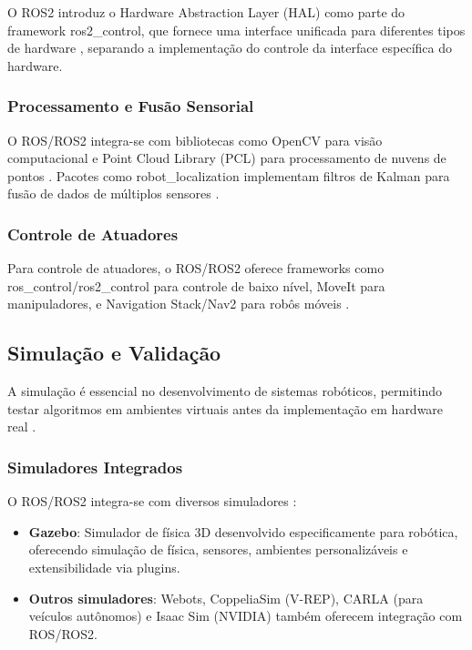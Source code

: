 O ROS2 introduz o Hardware Abstraction Layer (HAL) como parte do framework ros2_control, que fornece uma interface unificada para diferentes tipos de hardware \cite{Macenski2022}, separando a implementação do controle da interface específica do hardware.

\subsubsection{Processamento e Fusão Sensorial}

O ROS/ROS2 integra-se com bibliotecas como OpenCV para visão computacional e Point Cloud Library (PCL) para processamento de nuvens de pontos \cite{Joseph2018, Macenski2022}. Pacotes como robot_localization implementam filtros de Kalman para fusão de dados de múltiplos sensores \cite{Joseph2018, Macenski2022}.

\subsubsection{Controle de Atuadores}

Para controle de atuadores, o ROS/ROS2 oferece frameworks como ros_control/ros2_control para controle de baixo nível, MoveIt para manipuladores, e Navigation Stack/Nav2 para robôs móveis \cite{Joseph2018, Macenski2022}.

\subsection{Simulação e Validação}

A simulação é essencial no desenvolvimento de sistemas robóticos, permitindo testar algoritmos em ambientes virtuais antes da implementação em hardware real \cite{Siegwart2011}.

\subsubsection{Simuladores Integrados}

O ROS/ROS2 integra-se com diversos simuladores \cite{Joseph2018, Macenski2022}:

\begin{itemize}
    \item \textbf{Gazebo}: Simulador de física 3D desenvolvido especificamente para robótica, oferecendo simulação de física, sensores, ambientes personalizáveis e extensibilidade via plugins.
    
    \item \textbf{Outros simuladores}: Webots, CoppeliaSim (V-REP), CARLA (para veículos autônomos) e Isaac Sim (NVIDIA) também oferecem integração com ROS/ROS2.
\end{itemize}

